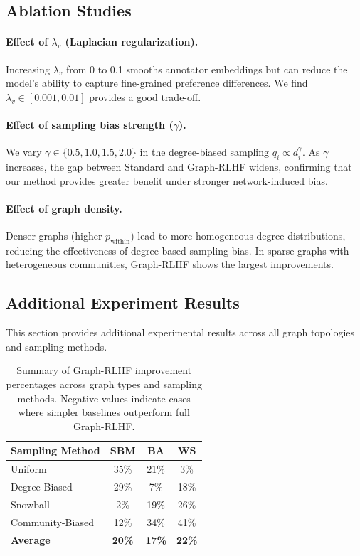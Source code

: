\documentclass{article}
\theoremstyle{plain}
\theoremstyle{definition}
\theoremstyle{remark}
\begin{document}
\subsection{Ablation Studies}
\label{app:ablations}

\paragraph{Effect of $\lambda_v$ (Laplacian regularization).}
Increasing $\lambda_v$ from 0 to 0.1 smooths annotator embeddings but can
reduce the model's ability to capture fine-grained preference differences.
We find $\lambda_v \in [0.001, 0.01]$ provides a good trade-off.

\paragraph{Effect of sampling bias strength ($\gamma$).}
We vary $\gamma \in \{0.5, 1.0, 1.5, 2.0\}$ in the degree-biased sampling
$q_i \propto d_i^\gamma$. As $\gamma$ increases, the gap between Standard and
Graph-RLHF widens, confirming that our method provides greater benefit under
stronger network-induced bias.

\paragraph{Effect of graph density.}
Denser graphs (higher $p_{\text{within}}$) lead to more homogeneous degree
distributions, reducing the effectiveness of degree-based sampling bias. In
sparse graphs with heterogeneous communities, Graph-RLHF shows the largest
improvements.

\subsection{Additional Experiment Results}
\label{app:full-synthetic}

This section provides additional experimental results across all graph topologies and sampling methods.

\begin{table}[h]
\caption{Summary of Graph-RLHF improvement percentages across graph types and sampling methods. Negative values indicate cases where simpler baselines outperform full Graph-RLHF.}
\label{tab:improvement-summary}
\centering
\small
\begin{tabular}{lccc}
\toprule
\textbf{Sampling Method} & \textbf{SBM} & \textbf{BA} & \textbf{WS} \\
\midrule
Uniform & 35\% & 21\% & 3\% \\
Degree-Biased & 29\% & 7\% & 18\% \\
Snowball & 2\% & 19\% & 26\% \\
Community-Biased & 12\% & 34\% & 41\% \\
\midrule
\textbf{Average} & \textbf{20\%} & \textbf{17\%} & \textbf{22\%} \\
\bottomrule
\end{tabular}
\end{table}
\end{document}
